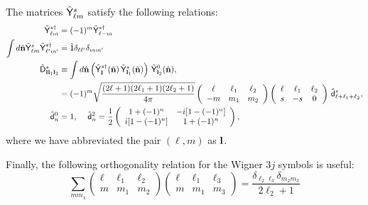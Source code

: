 \documentclass[a4paper,10pt]{article}
\newcommand{\nv}{\hat{\bf n}}
\newcommand{\wtj}[6]{\left(\begin{array}{ccc} #1 & #2 & #3\\#4 & #5 & #6\end{array} \right)}
\begin{document}
The matrices $\hat{\sf Y}^s_{\ell m}$ satisfy the following relations:
\begin{align}
  \hat{\sf Y}^{s\dag}_{\ell m}&=(-1)^m\hat{\sf Y}^{s\dag}_{\ell -m}\\
  \int d\nv \hat{\sf Y}^s_{\ell m}\hat{\sf Y}^{s\dag}_{\ell'm'}&=\hat{\sf 1}\delta_{\ell\ell'}\delta_{mm'}\\
  \hat{\sf D}^s_{{\bf l}{\bf l}_1{\bf l}_2}&\equiv\int d\nv \left(\hat{\sf Y}^{s\dag}_{\bf l}(\nv)\,\hat{\sf Y}^{s}_{{\bf l}_1}(\nv)\right)\,\hat{\sf Y}^0_{{\bf l}_2}(\nv),\\
  &=(-1)^m\sqrt{\frac{(2\ell+1)(2\ell_1+1)(2\ell_2+1)}{4\pi}}\wtj{\ell}{\ell_1}{\ell_2}{-m}{m_1}{m_2}\wtj{\ell}{\ell_1}{\ell_2}{s}{-s}{0}\,\hat{\sf d}^s_{\ell+\ell_1+\ell_2},\\
     \hat{\sf d}^0_n&=1,\hspace{12pt}
   \hat{\sf d}^2_n=\frac{1}{2}\left(\begin{array}{cc}
                                      1+(-1)^n & -i[1-(-1)^n]\\
                                      i[1-(-1)^n] & 1+(-1)^n
                                     \end{array}\right),
\end{align}
where we have abbreviated the pair $(\ell,m)$ as ${\bf l}$.

Finally, the following orthogonality relation for the Wigner 3$j$ symbols is useful:
\begin{equation}
  \sum_{mm_1}\wtj{\ell}{\ell_1}{\ell_2}{m}{m_1}{m_2}\wtj{\ell}{\ell_1}{\ell_3}{m}{m_1}{m_3}=\frac{\delta_{\ell_2\ell_3}\delta_{m_2m_3}}{2\ell_2+1}
\end{equation}
\end{document}
